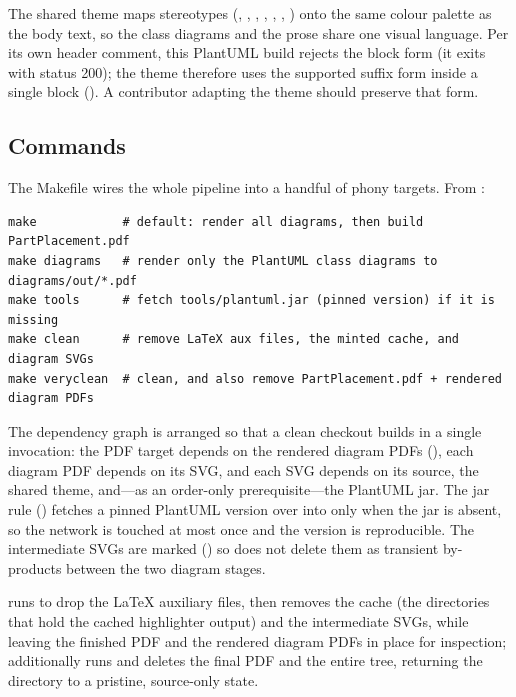 The shared theme  maps stereotypes (,
, , , , ,
) onto the same colour palette as the body text, so the class diagrams and
the prose share one visual language. Per its own header comment, this PlantUML build rejects
the block form  (it exits with status 200); the theme
therefore uses the supported  suffix form inside a single
 block (). A contributor adapting
the theme should preserve that form.

\subsection{Commands}

The Makefile wires the whole pipeline into a handful of phony targets. From
:

\begin{verbatim}
make            # default: render all diagrams, then build PartPlacement.pdf
make diagrams   # render only the PlantUML class diagrams to diagrams/out/*.pdf
make tools      # fetch tools/plantuml.jar (pinned version) if it is missing
make clean      # remove LaTeX aux files, the minted cache, and diagram SVGs
make veryclean  # clean, and also remove PartPlacement.pdf + rendered diagram PDFs
\end{verbatim}

The dependency graph is arranged so that a clean checkout builds in a single 
invocation: the PDF target depends on the rendered diagram PDFs (), each
diagram PDF depends on its SVG, and each SVG depends on its  source, the shared
theme, and---as an order-only prerequisite---the PlantUML jar. The jar rule
() fetches a pinned PlantUML version over  into 
only when the jar is absent, so the network is touched at most once and the version is
reproducible. The intermediate SVGs are marked  () so
 does not delete them as transient by-products between the two diagram stages.

 runs  to drop the \LaTeX{} auxiliary files, then removes
the  cache (the  directories that hold the cached highlighter
output) and the intermediate SVGs, while leaving the finished PDF and the rendered diagram
PDFs in place for inspection;  additionally runs  and
deletes the final PDF and the entire  tree, returning the directory to a
pristine, source-only state.

